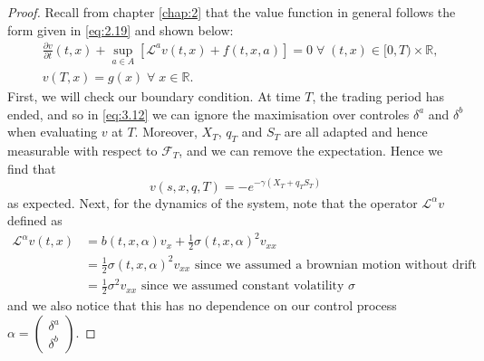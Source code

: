 \begin{proof}
    Recall from chapter \ref{chap:2} that the value function in general follows the 
    form given in \eqref{eq:2.19} and shown below:
    \begin{equation*}
        \begin{aligned}
            &\frac{\partial v}{\partial t}(t,x)+\sup_{a\in A}\left[\mathcal{L}^av(t,x)+f(t,x,a)\right]=0\;\forall\;(t,x)\in[0,T)\times\mathbb{R},\\
            &v(T,x)=g(x)\;\forall\;x\in\mathbb{R}.
        \end{aligned}
    \end{equation*}
    First, we will check our boundary condition. At time $T$, the trading period 
    has ended, and so in \eqref{eq:3.12} we can ignore the maximisation over 
    controles $\delta^a$ and $\delta^b$ when evaluating $v$ at $T$. Moreover,
    $X_T$, $q_T$ and $S_T$ are all adapted and hence measurable with respect to 
    $\mathcal{F}_T$, and we can remove the expectation. Hence we find that 
    \begin{equation}
        v(s,x,q,T)=-e^{-\gamma(X_T+q_TS_T)}
    \end{equation}
    as expected. Next, for the dynamics of the system, note that the operator 
    $\mathcal{L}^\alpha v$ defined as 
    \begin{align*}
        \mathcal{L}^\alpha v(t,x)&=b(t,x,\alpha)v_x+\frac{1}{2}\sigma(t,x,\alpha)^2v_{xx}\\
        &=\frac{1}{2}\sigma(t,x,\alpha)^2v_{xx}\textrm{ since we assumed a brownian motion without drift}\\
        &=\frac{1}{2}\sigma^2v_{xx}\textrm{ since we assumed constant volatility $\sigma$}
    \end{align*}
    and we also notice that this has no dependence on our control process 
    $\alpha=\begin{pmatrix}\delta^{a}\\\delta^{b}\end{pmatrix}$.


\end{proof}
